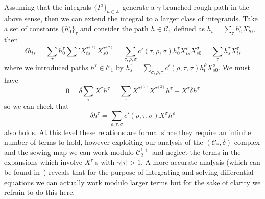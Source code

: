 \documentclass[a4paper]{article}
\newcommand{\1}{{\bf 1}}
\newcommand{\der}{\delta}
\newcommand{\CC}{\mathcal{C}}
\newcommand{\LL}{\mathcal{L}}
\newcommand{\CC}{\mathcal{C}}
\newcommand{\der}{\delta}
\begin{document}
Assuming that the integrals $\{I^a\}_{a \in \LL}$ generate a
$\gamma$-branched rough path in the above sense, then we can extend
the integral to a larger class of integrands. Take a set of constants
$\{h^\tau_0 \}_\tau$ and consider the path $h \in \CC_1$ defined as
$
h_t = \sum_\tau h^\tau_0 X^{\tau}_{t0}
$, then
\begin{equation}
\label{eq:controlled-h}
\der h_{ts} = \sum_\tau h^\tau_0  \sum' X^{\tau^{(1)}}_{ts}
X^{\tau^{(2)}}_{s0} = \sum_{\tau,\rho,\sigma} c'(\tau,\rho,\sigma) h^\tau_0 X^{\rho}_{ts}
X^{\sigma}_{s0} = \sum_\tau h^{\tau}_s X^{\tau}_{ts}
\end{equation}
where we introduced paths $h^\tau \in \CC_1$ by
$
h^\tau_s =  \sum_{\sigma,\rho,\tau} c'(\rho,\tau,\sigma) h^\rho_0 X^{\sigma}_{s0}
$.
We must have
$$
0= \der \sum_\tau  X^{\tau} h^{\tau} = \sum_\tau X^{\tau^{(1)}}
X^{\tau^{(2)}} h^\tau - X^{\tau} \der h^\tau 
$$
so we can check that 
\begin{equation}
  \label{eq:controlled-derivatives}
\der h^{\tau} =  \sum_{\rho,\tau,\sigma} c'(\rho,\tau,\sigma) 
X^{\sigma} h^\rho   
\end{equation}
also holds. 
At this level these relations are formal since they require an
infinite number of terms to hold, however exploiting our analysis of
the $(\CC_*,\der)$ complex and the sewing map we can work modulo
$\CC_2^{1+}$ and neglect the terms in the expansions which involve
$X^\tau$-s with $\gamma|\tau| > 1$. A more accurate analysis (which
can be found in~\cite{ramif}) reveals that for the purpose of
integrating and solving
differential equations we can actually work modulo larger terms but
for the sake of clarity we refrain to do this here.
\end{document}
